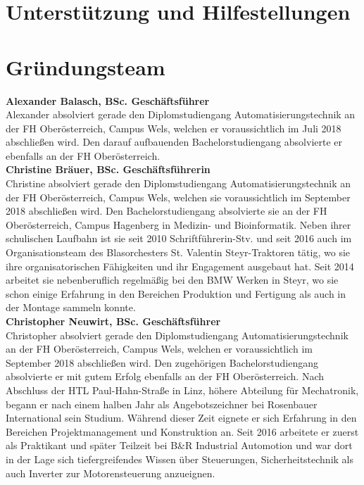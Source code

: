 \section{Unterstützung und Hilfestellungen}

\section{Gründungsteam}
\textbf{Alexander Balasch, BSc. Geschäftsführer} \\
Alexander absolviert gerade den Diplomstudiengang Automatisierungstechnik an der FH Oberösterreich, Campus Wels, welchen er voraussichtlich im Juli 2018 abschließen wird. Den darauf aufbauenden Bachelorstudiengang absolvierte er ebenfalls an der FH Oberösterreich. \\ %


\textbf{Christine Bräuer, BSc. Geschäftsführerin} \\
Christine absolviert gerade den Diplomstudiengang Automatisierungstechnik an der FH Oberösterreich, Campus Wels, welchen sie voraussichtlich im September 2018 abschließen wird. Den Bachelorstudiengang absolvierte sie an der FH Oberösterreich, Campus Hagenberg in Medizin- und Bioinformatik. 
Neben ihrer schulischen Laufbahn ist sie seit 2010 Schriftführerin-Stv. und seit 2016 auch im Organisationsteam des Blasorchesters St. Valentin Steyr-Traktoren tätig, wo sie ihre organisatorischen Fähigkeiten und ihr Engagement ausgebaut hat. Seit 2014 arbeitet sie nebenberuflich regelmäßig bei den BMW Werken in Steyr, wo sie schon einige Erfahrung in den Bereichen Produktion und Fertigung als auch in der Montage sammeln konnte. \\

\textbf{Christopher Neuwirt, BSc. Geschäftsführer} \\
Christopher absolviert gerade den Diplomstudiengang Automatisierungstechnik an der FH Oberösterreich, Campus Wels, welchen er voraussichtlich im September 2018 abschließen wird. Den zugehörigen Bachelorstudiengang absolvierte er mit gutem Erfolg ebenfalls an der FH Oberösterreich. Nach Abschluss der HTL Paul-Hahn-Straße in Linz, höhere Abteilung für Mechatronik, begann er nach einem halben Jahr als Angebotszeichner bei Rosenbauer International sein Studium. Während dieser Zeit eignete er sich Erfahrung in den Bereichen Projektmanagement und Konstruktion an. Seit 2016 arbeitete er zuerst als Praktikant und später Teilzeit bei B\&R Industrial Automotion und war dort in der Lage sich tiefergreifendes Wissen über Steuerungen, Sicherheitstechnik als auch Inverter zur Motorensteuerung anzueignen.\\

